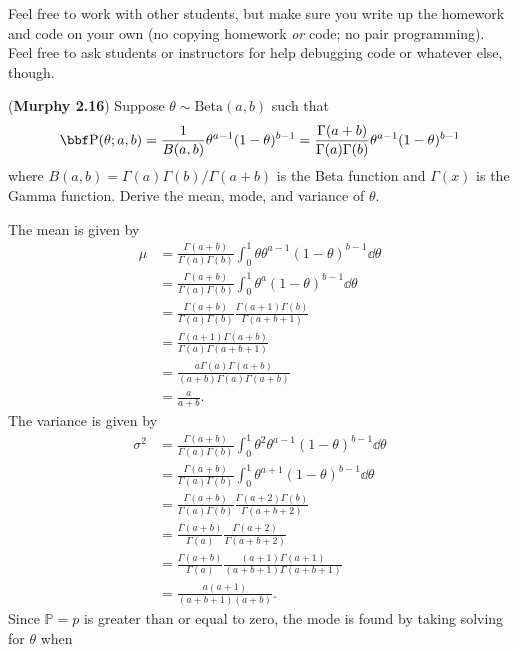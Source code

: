 \documentclass[12pt,letterpaper]{hmcpset}
\begin{document}
Feel free to work with other students, but make sure you write up the homework
and code on your own (no copying homework \textit{or} code; no pair programming).
Feel free to ask students or instructors for help debugging code or whatever else,
though.

\begin{problem}[1]
(\textbf{Murphy 2.16}) Suppose $\theta \sim \text{Beta}(a,b)$ such
        that
        \[
            \PP(\theta; a,b) = \frac{1}{B(a,b)} \theta^{a-1}(1-\theta)^{b-1} = \frac{\Gamma(a+b)}{\Gamma(a)\Gamma(b)} \theta^{a-1}(1-\theta)^{b-1}
        \]
        where $B(a,b) = \Gamma(a)\Gamma(b)/\Gamma(a+b)$ is the Beta function
        and $\Gamma(x)$ is the Gamma function.
        Derive the mean, mode, and variance of $\theta$.
\end{problem}
\begin{solution}
The mean is given by
\begin{align*}
    \mu &= \frac{\Gamma(a+b)}{\Gamma(a)\Gamma(b)}  \int_0^1 \theta \theta^{a-1}(1-\theta)^{b-1} \dd{\theta} \\ 
    &=\frac{\Gamma(a+b)}{\Gamma(a)\Gamma(b)} \int_0^1 \theta^a (1 - \theta)^{b -1} \dd{\theta } \\
    &= \frac{\Gamma(a+b)}{\Gamma(a)\Gamma(b)} \frac{\Gamma(a +1)\Gamma(b)} {\Gamma(a+b + 1)} \\
    &= \frac{\Gamma(a+1)\Gamma(a+b)}{{\Gamma(a)\Gamma(a+b + 1)}} \\
    &= \frac{a\Gamma(a) \Gamma(a+b)}{(a+b)\Gamma(a)\Gamma(a+b)} \\&= \frac{a}{a+b}.
\end{align*}
The variance is given by 
\begin{align*}
    \sigma^2 &= \frac{\Gamma(a+b)}{\Gamma(a)\Gamma(b)}  \int_0^1 \theta^2 \theta^{a-1}(1-\theta)^{b-1} \dd{\theta} \\ 
    &= \frac{\Gamma(a+b)}{\Gamma(a)\Gamma(b)}  \int_0^1 \theta^{a+1}(1-\theta)^{b-1} \dd{\theta} \\ 
    &= \frac{\Gamma(a+b)}{\Gamma(a)\Gamma(b)} \frac{\Gamma(a + 2)\Gamma(b)} {\Gamma(a+b + 2)} \\
    &= \frac{\Gamma(a+b)}{\Gamma(a)} \frac{\Gamma(a + 2)} {\Gamma(a+b + 2)} \\
    &= \frac{\Gamma(a+b)}{\Gamma(a)} \frac{(a + 1)\Gamma(a + 1)} {(a + b + 1)\Gamma(a+b + 1)} \\
    &= \frac{a(a+1)}{(a + b + 1)(a + b)}.
\end{align*}
Since $\mathbb P = p$ is greater than or equal to zero, the mode is found by taking solving for $\theta$ when 

\end{solution}
\end{document}
